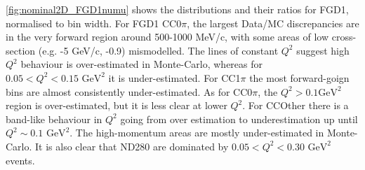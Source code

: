 \autoref{fig:nominal2D_FGD1numu} shows the \pmu \cosmu distributions and their ratios for FGD1, normalised to bin width. For FGD1 CC0$\pi$, the largest Data/MC discrepancies are in the very forward region around 500-1000 MeV/c, with some areas of low cross-section  (e.g. -5 GeV/c, -0.9) mismodelled. The lines of constant $Q^2$ suggest high $Q^2$ behaviour is over-estimated in Monte-Carlo, whereas for $0.05 < Q^2 < 0.15 \text{ GeV}^2$ it is under-estimated. For CC1$\pi$ the most forward-goign bins are almost consistently under-estimated. As for CC0$\pi$, the $Q^2 >0.1 \text{GeV}^2$ region is over-estimated, but it is less clear at lower $Q^2$. For CCOther there is a band-like behaviour in $Q^2$ going from over estimation to underestimation up until $Q^2\sim0.1\text{ GeV}^2$. The high-momentum areas are mostly under-estimated in Monte-Carlo. It is also clear that ND280 are dominated by $0.05 < Q^2 < 0.30\text{ GeV}^2$ events.

